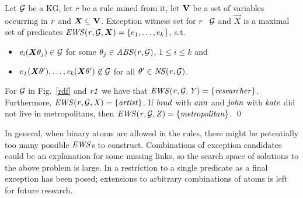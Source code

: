 

\begin{definition} \label{def:ews}
Let $\mathcal{G}$ be a KG, let $r$ be a rule mined from it, let ${\mathbf V}$ be a set of variables occurring in $\mathit{r}$ and $\vec{X}\subseteq \cV$. Exception witness set for $r$ \wrt\ $\mathcal{G}$ and $\vec{X}$ is a maximal set of predicates $\mi{EWS(r,\cG,\vec{X})}=\{e_1,\dotsc,e_k\}$, s.t.
\begin{itemize}
\item $\mi{e_i}(\vec{X}\theta_j)\in \cG$ for some $\theta_j\in \mathit{ABS(r,\mathcal{G})}$, $1 \leq i\leq k$ and
\item $\mi{e_1}(\vec{X}\theta'),\dotsc,\mi{e_k}(\vec{X}\theta')\not \in \cG$ for all $\theta' \in \mathit{NS(r,\mathcal{G})}$.
\end{itemize}
\end{definition}

\begin{example}
For $\mathcal{G}$ in Fig.~\ref{rdf} and $\mathit{r1}$ 
we have that $\mathit{EWS(r,\mathcal{G},Y)}=\{\mathit{researcher}\}$. Furthermore,
 $\mathit{EWS(r,\mathcal{G},X)}=\{\mathit{artist}\}$. If $\mathit{brad}$ with $\mathit{ann}$ and $\mathit{john}$ with $\mathit{kate}$ did not live in %
metropolitans, then $\mathit{EWS(r,\mathcal{G},Z)}=\{\mathit{metropolitan}\}$. \qed
\end{example}
In general, when binary atoms are allowed in the rules, there might be potentially too many possible $\mathit{EWS}$s to construct. 
Combinations of exception candidates could be an explanation for some missing links, so the search space of solutions to the above problem is large. In \cite{rumis} a restriction to a single predicate as a final exception has been posed; extensions to arbitrary combinations of atoms is left for future research.





